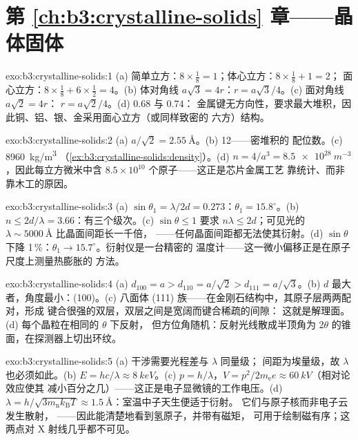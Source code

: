 \section*{第 \ref{ch:b3:crystalline-solids} 章——晶体固体}

\begin{solution}{exo:b3:crystalline-solids:1}
(a) 简单立方：$8\times\tfrac18 = 1$；体心立方：$8\times\tfrac18 + 1 = 2$；
面心立方：$8\times\tfrac18 + 6\times\tfrac12 = 4$。(b) 体对角线
$a\sqrt3 = 4r$：$r = a\sqrt3/4$。(c) 面对角线 $a\sqrt2 = 4r$：
$r = a\sqrt2/4$。(d) $0.68$ 与 $0.74$：
金属键无方向性，要求最大堆积，因此铜、铝、银、金采用面心立方（或同样致密的
六方）结构。
\end{solution}

\begin{solution}{exo:b3:crystalline-solids:2}
(a) $a/\sqrt2 = \qty{2.55}{\angstrom}$。(b) 12——密堆积的
配位数。(c) \qty{8960}{kg/m^3}
（\cref{ex:b3:crystalline-solids:density}）。(d) $n = 4/a^3 =
\qty{8.5e28}{m^{-3}}$，因此每立方微米中含
$8.5\times10^{10}$ 个原子——这正是芯片金属工艺
靠统计、而非靠木工的原因。
\end{solution}

\begin{solution}{exo:b3:crystalline-solids:3}
(a) $\sin\theta_1 = \lambda/2d = 0.273$：$\theta_1 =
15.8^\circ$。(b) $n \le 2d/\lambda = 3.66$：有三个级次。(c)
$\sin\theta \le 1$ 要求 $n\lambda \le 2d$；可见光的
$\lambda \sim \qty{5000}{\angstrom}$ 比晶面间距长一千倍，
——任何晶面间距都无法使其衍射。(d) $\sin\theta$
下降 1\,\%：$\theta_1 \to 15.7^\circ$。衍射仪是一台精密的
温度计——这一微小偏移正是在原子尺度上测量热膨胀的
方法。
\end{solution}

\begin{solution}{exo:b3:crystalline-solids:4}
(a) $d_{100} = a > d_{110} = a/\sqrt2 > d_{111} = a/\sqrt3$。(b)
$d$ 最大者，角度最小：(100)。(c) 八面体
(111) 族——在金刚石结构中，其原子层两两配对，形成
键合很强的双层，双层之间是宽阔而键合稀疏的间隙：
这就是解理面。(d) 每个晶粒在相同的 $\theta$ 下反射，
但方位角随机：反射光线散成半顶角为
$2\theta$ 的锥面，在探测器上切出环纹。
\end{solution}

\begin{solution}{exo:b3:crystalline-solids:5}
(a) 干涉需要光程差与 $\lambda$ 同量级；
间距为埃量级，故 $\lambda$ 也必须如此。(b) $E =
hc/\lambda \approx \qty{8}{keV}$。(c) $p = h/\lambda$，$V =
p^2/2m_{\text{e}}e \approx \qty{60}{kV}$（相对论效应使其
减小百分之几）——这正是电子显微镜的工作电压。(d)
$\lambda = h/\sqrt{3m_{\text{n}}k_{\text{B}}T} \approx
\qty{1.5}{\angstrom}$：室温中子天生便适于衍射。
它们与原子核而非电子云发生散射，
——因此能清楚地看到氢原子，并带有磁矩，
可用于绘制磁有序；这两点对 X 射线几乎都不可见。
\end{solution}

